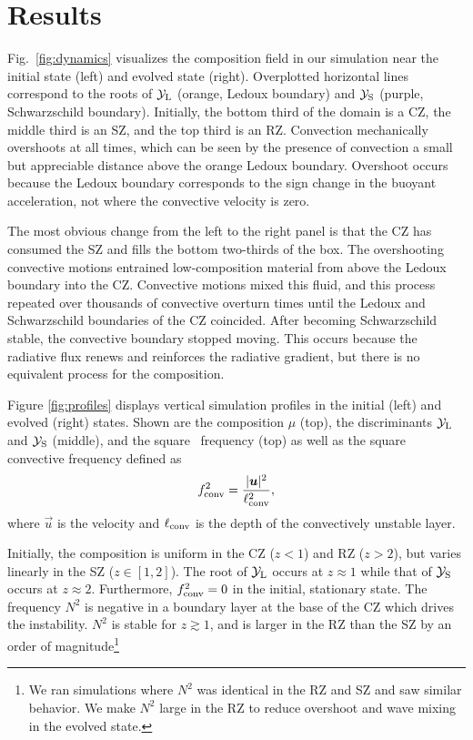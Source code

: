 \section{Results}
\label{sec:results}

Fig.~\ref{fig:dynamics} visualizes the composition field in our simulation near the initial state (left) and evolved state (right).
Overplotted horizontal lines correspond to the roots of $\mathcal{Y}_{\rm{L}}$ (orange, Ledoux boundary) and $\mathcal{Y}_{\rm{S}}$ (purple, Schwarzschild boundary).
Initially, the bottom third of the domain is a CZ, the middle third is an SZ, and the top third is an RZ.
Convection mechanically overshoots at all times, which can be seen by the presence of convection a small but appreciable distance above the orange Ledoux boundary.
Overshoot occurs because the Ledoux boundary corresponds to the sign change in the buoyant acceleration, not where the convective velocity is zero.

The most obvious change from the left to the right panel is that the CZ has consumed the SZ and fills the bottom two-thirds of the box.
The overshooting convective motions entrained low-composition material from above the Ledoux boundary into the CZ.
Convective motions mixed this fluid, and this process repeated over thousands of convective overturn times until the Ledoux and Schwarzschild boundaries of the CZ coincided.
After becoming Schwarzschild stable, the convective boundary stopped moving.
This occurs because the radiative flux renews and reinforces the radiative gradient, but there is no equivalent process for the composition.

Figure \ref{fig:profiles} displays vertical simulation profiles in the initial (left) and evolved (right) states.
Shown are the composition $\mu$ (top), the discriminants $\mathcal{Y}_{\rm{L}}$ and $\mathcal{Y}_{\rm{S}}$ (middle), and the square \brunt$\,$ frequency (top) as well as the square convective frequency defined as
\begin{equation}
f_{\rm{conv}}^2 = \frac{|\vec{u}|^2}{\ell_{\rm{conv}}^2},
\label{eqn:fconv2}
\end{equation}
where $\vec{u}$ is the velocity and $\ell_{\rm{conv}}$ is the depth of the convectively unstable layer.

Initially, the composition is uniform in the CZ ($z < 1$) and RZ ($z > 2$), but varies linearly in the SZ ($z \in [1, 2]$).
The root of $\mathcal{Y}_{\rm{L}}$ occurs at $z \approx 1$ while that of $\mathcal{Y}_{\rm{S}}$ occurs at $z \approx 2$.
Furthermore, $f_{\rm{conv}}^2 = 0$ in the initial, stationary state.
The \brunt$\,$ frequency $N^2$ is negative in a boundary layer at the base of the CZ which drives the instability.
$N^2$ is stable for $z \gtrsim 1$, and is larger in the RZ than the SZ by an order of magnitude\footnote{We ran simulations where $N^2$ was identical in the RZ and SZ and saw similar behavior.
We make $N^2$ large in the RZ to reduce overshoot and wave mixing in the evolved state.}

